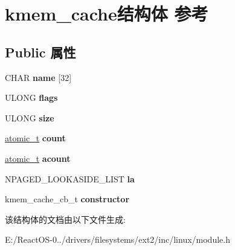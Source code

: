 \hypertarget{structkmem__cache}{}\section{kmem\+\_\+cache结构体 参考}
\label{structkmem__cache}
\subsection*{Public 属性}
\begin{DoxyCompactItemize}
\item 
\mbox{\label{structkmem__cache_a1b5dbdc4361f7bd95010f92d536bfebf}} 
C\+H\+AR {\bfseries name} \mbox{[}32\mbox{]}
\item 
\mbox{\label{structkmem__cache_af82971016ea65876da91ce938818af96}} 
U\+L\+O\+NG {\bfseries flags}
\item 
\mbox{\label{structkmem__cache_a2e28221a5732df89c21d43b0b907314e}} 
U\+L\+O\+NG {\bfseries size}
\item 
\mbox{\label{structkmem__cache_a9fe18ff16422e797e3f63118e565e349}} 
\hyperlink{structatomic__t}{atomic\+\_\+t} {\bfseries count}
\item 
\mbox{\label{structkmem__cache_a44e396ca620d5002bfc1cf67f1d82f55}} 
\hyperlink{structatomic__t}{atomic\+\_\+t} {\bfseries acount}
\item 
\mbox{\label{structkmem__cache_ad9cb06d7d719bfca7ce7dfd1d02a166c}} 
N\+P\+A\+G\+E\+D\+\_\+\+L\+O\+O\+K\+A\+S\+I\+D\+E\+\_\+\+L\+I\+ST {\bfseries la}
\item 
\mbox{\label{structkmem__cache_aaeaad77e8ea6af43aecd159243ee9ffc}} 
kmem\+\_\+cache\+\_\+cb\+\_\+t {\bfseries constructor}
\end{DoxyCompactItemize}


该结构体的文档由以下文件生成\+:\begin{DoxyCompactItemize}
\item 
E\+:/\+React\+O\+S-\/0../drivers/filesystems/ext2/inc/linux/module.\+h\end{DoxyCompactItemize}
